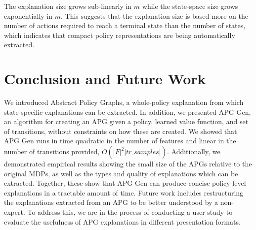 \documentclass[letterpaper]{article} %
\begin{document}
\vspace{-3.34mm}
The explanation size grows sub-linearly in $m$ while the state-space size grows exponentially in $m$.
This suggests that the explanation size is based more on the number of actions required to reach a terminal state than the number of states, which indicates that compact policy representations are being automatically extracted.

\vspace{-3.41mm}
\section{Conclusion and Future Work}
We introduced Abstract Policy Graphs, a whole-policy explanation from which state-specific explanations can be extracted. In addition, we presented APG Gen, an algorithm for creating an APG given a policy, learned value function, and set of transitions, without constraints on how these are created. We showed that APG Gen runs in time quadratic in the number of features and linear in the number of transitions provided, $O(|F|^2 |tr\_samples|)$. Additionally, we demonstrated empirical results showing the small size of the APGs relative to the original MDPs, as well as the types and quality of explanations which can be extracted. Together, these show that APG Gen can produce concise policy-level explanations in a tractable amount of time.
Future work includes restructuring the explanations extracted from an APG to be better understood by a non-expert.
To address this, we are in the process of conducting a user study to evaluate the usefulness of APG explanations in different presentation formats.

\vspace{-3.33mm}
\end{document}
